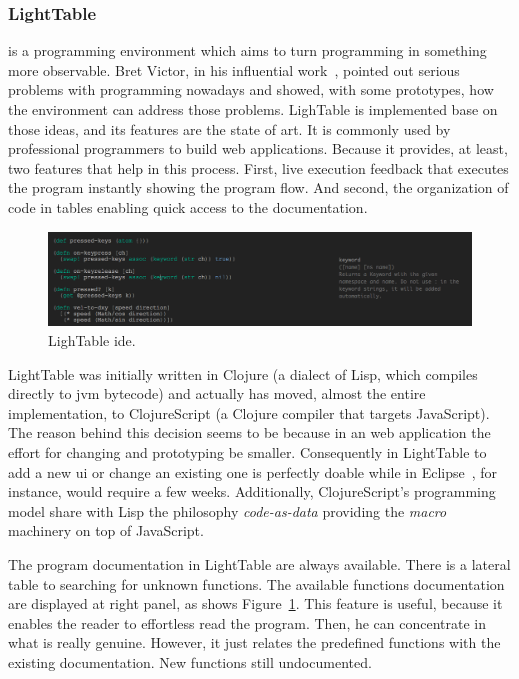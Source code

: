 \subsubsection{LightTable\protect\footnotemark[\ref{lt:note}]} is a programming environment which aims to turn programming in something more observable. Bret Victor, in his influential work~\cite{inventingPrin,learnableProg}, pointed out serious problems with programming nowadays and showed, with some prototypes, how the environment can address those problems. LighTable is implemented base on those ideas, and its features are the state of art. It is commonly used by professional programmers to build web applications. Because it provides, at least, two features that help in this process. First, live execution feedback that executes the program instantly showing the program flow. And second, the organization of code in tables enabling quick access to the documentation.

\begin{figure}[!htbp]
  \centering
  \includegraphics[width=1.0\textwidth]{img/lt2}
    \caption{LighTable \ac{ide}.}  
  \label{fig:lt}
\end{figure} 

LightTable was initially written in Clojure (a dialect of Lisp, which compiles directly to \ac{jvm} bytecode) and actually has moved, almost the entire implementation, to ClojureScript (a Clojure compiler that targets JavaScript). The reason behind this decision seems to be because in an web application the effort for changing and prototyping be smaller. Consequently in LightTable to add a new \ac{ui} or change an existing one is perfectly doable while in Eclipse~\cite{carlson2005eclipse}, for instance, would require a few weeks. Additionally, ClojureScript's programming model share with Lisp the philosophy \textit{code-as-data} providing the \textit{macro} machinery on top of JavaScript.

The program documentation in LightTable are always available. There is a lateral table to searching for unknown functions. The available functions documentation are displayed at right panel, as shows Figure~\ref{fig:lt}. This feature is useful, because it enables the reader to effortless read the program. Then, he can concentrate in what is really genuine. However, it just relates the predefined functions with the existing documentation. New functions still undocumented. 

